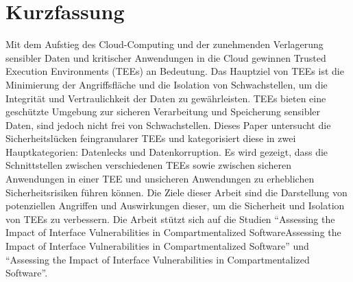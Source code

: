 \section*{Kurzfassung}
Mit dem Aufstieg des Cloud-Computing und der zunehmenden Verlagerung sensibler Daten und kritischer Anwendungen in die Cloud gewinnen Trusted Execution Environments (TEEs) an Bedeutung. Das Hauptziel von TEEs ist die Minimierung der Angriffsfläche und die Isolation von Schwachstellen, um die Integrität und Vertraulichkeit der Daten zu gewährleisten. TEEs bieten eine geschützte Umgebung zur sicheren Verarbeitung und Speicherung sensibler Daten, sind jedoch nicht frei von Schwachstellen. 
Dieses Paper untersucht die Sicherheitslücken feingranularer TEEs und kategorisiert diese in zwei Hauptkategorien: Datenlecks und Datenkorruption. Es wird gezeigt, dass die Schnittstellen zwischen verschiedenen TEEs sowie zwischen sicheren Anwendungen in einer TEE und unsicheren Anwendungen zu erheblichen Sicherheitsrisiken führen können.
Die Ziele dieser Arbeit sind die Darstellung von potenziellen Angriffen und Auswirkungen dieser, um die Sicherheit und Isolation von TEEs zu verbessern. Die Arbeit stützt sich auf die Studien \enquote{Assessing the Impact of Interface Vulnerabilities in Compartmentalized SoftwareAssessing the Impact of Interface Vulnerabilities in Compartmentalized Software}\cite{CIVPaper} und \enquote{Assessing the Impact of Interface Vulnerabilities in Compartmentalized Software}\cite{TEEPaper}.